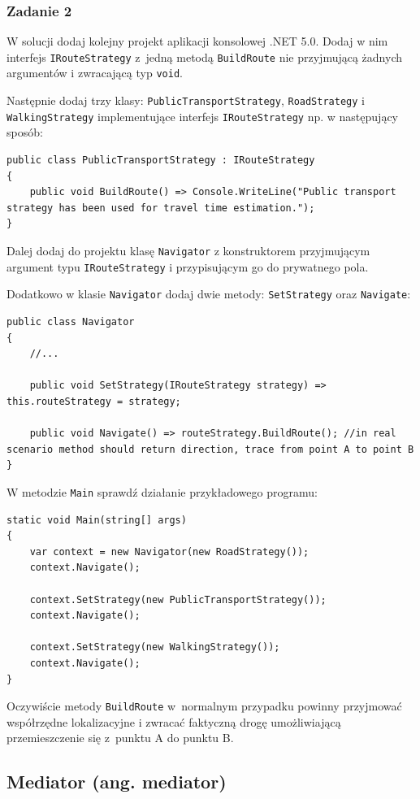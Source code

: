 \subsubsection{Zadanie 2}
W solucji dodaj kolejny projekt aplikacji konsolowej .NET 5.0. Dodaj w nim interfejs \texttt{IRouteStrategy} z~jedną metodą \texttt{BuildRoute} nie przyjmującą żadnych argumentów i zwracającą typ \texttt{void}. 

Następnie dodaj trzy klasy: \texttt{PublicTransportStrategy}, \texttt{RoadStrategy} i \texttt{WalkingStrategy} implementujące interfejs \texttt{IRouteStrategy} np. w następujący sposób:
\begin{lstlisting}
public class PublicTransportStrategy : IRouteStrategy
{
	public void BuildRoute() => Console.WriteLine("Public transport strategy has been used for travel time estimation.");
}
\end{lstlisting}

Dalej dodaj do projektu klasę \texttt{Navigator} z konstruktorem przyjmującym argument typu \texttt{IRouteStrategy} i przypisującym go do prywatnego pola. 

Dodatkowo w klasie \texttt{Navigator} dodaj dwie metody: \texttt{SetStrategy} oraz \texttt{Navigate}:
\begin{lstlisting}
public class Navigator
{
	//...
	
	public void SetStrategy(IRouteStrategy strategy) => this.routeStrategy = strategy;
	
	public void Navigate() => routeStrategy.BuildRoute(); //in real scenario method should return direction, trace from point A to point B
}
\end{lstlisting}

W metodzie \texttt{Main} sprawdź działanie przykładowego programu:
\begin{lstlisting}
static void Main(string[] args)
{
	var context = new Navigator(new RoadStrategy());
	context.Navigate();
	
	context.SetStrategy(new PublicTransportStrategy());
	context.Navigate();
	
	context.SetStrategy(new WalkingStrategy());
	context.Navigate();
}
\end{lstlisting}

Oczywiście metody \texttt{BuildRoute} w~normalnym przypadku powinny przyjmować współrzędne lokalizacyjne i zwracać faktyczną drogę umożliwiającą przemieszczenie się z~punktu A do punktu B.

\subsection{Mediator (ang. mediator)}

